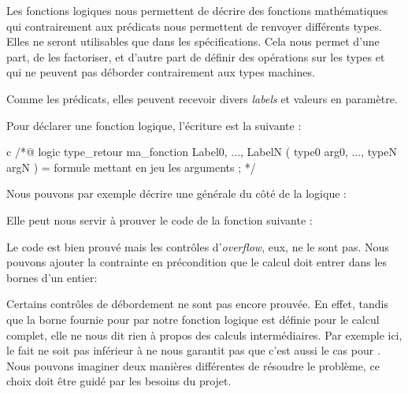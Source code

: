 Les fonctions logiques nous permettent de décrire des fonctions mathématiques
qui contrairement aux prédicats nous permettent de renvoyer différents types.
Elles ne seront utilisables que dans les spécifications. Cela nous permet d'une
part, de les factoriser, et d'autre part de définir des opérations sur les
types  et  qui ne peuvent pas déborder
contrairement aux types machines.



Comme les prédicats, elles peuvent recevoir divers \textit{labels} et valeurs en 
paramètre.





Pour déclarer une fonction logique, l'écriture est la suivante :



\begin{CodeBlock}{c}
/*@
  logic type_retour ma_fonction{ Label0, ..., LabelN }( type0 arg0, ..., typeN argN ) =
    formule mettant en jeu les arguments ;
*/
\end{CodeBlock}



Nous pouvons par exemple décrire une  générale du côté de la logique :






Elle peut nous servir à prouver le code de la fonction suivante :








Le code est bien prouvé mais les contrôles d'\textit{overflow}, eux, ne le sont pas.
Nous pouvons ajouter la contrainte en précondition que le calcul doit entrer dans
les bornes d'un entier:




Certains contrôles de débordement ne sont pas encore prouvée. En effet, tandis que
la borne fournie pour  par notre fonction logique est définie pour
le calcul complet, elle ne nous dit rien à propos des calculs intermédiaires. Par
exemple ici, le fait  ne soit pas inférieur à
 ne nous garantit pas que c'est aussi le cas pour
. Nous pouvons imaginer deux manières différentes de résoudre
le problème, ce choix doit être guidé par les besoins du projet.


